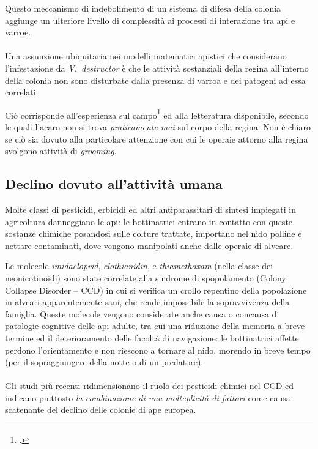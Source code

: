 Questo meccanismo di indebolimento di un sistema di difesa della colonia aggiunge un ulteriore livello di complessità ai processi di interazione tra api e varroe.

\paragraph{}
Una assunzione ubiquitaria nei modelli matematici apistici che considerano l'infestazione da \emph{V.~destructor} è
che le attività sostanziali della regina all'interno della colonia non sono disturbate dalla presenza di varroa e dei patogeni ad essa correlati.

Ciò corrisponde all'esperienza sul campo\footcite{privFDL,privFPan} ed alla letteratura disponibile, secondo le quali l'acaro non si trova \emph{praticamente mai} sul corpo della regina. Non è chiaro  se ciò sia dovuto alla particolare attenzione con cui le operaie attorno alla regina svolgono attività di \emph{grooming}.

\subsection{Declino dovuto all'attività umana}
Molte classi di pesticidi, erbicidi ed altri antiparassitari di sintesi impiegati in agricoltura danneggiano le api: le bottinatrici entrano in contatto con queste sostanze chimiche posandosi sulle colture trattate, importano nel nido polline e nettare contaminati, dove vengono manipolati anche dalle operaie di alveare.

Le molecole \emph{imidacloprid}, \emph{clothianidin}, e \emph{thiamethoxam} (nella classe dei neonicotinoidi) sono state correlate alla sindrome di spopolamento (Colony Collapse Disorder -- CCD) in cui si verifica un crollo repentino della popolazione in alveari apparentemente sani, che rende impossibile la sopravvivenza della famiglia.
Queste molecole vengono considerate anche causa o concausa di patologie cognitive delle api adulte, tra cui una riduzione della memoria a breve termine ed il deterioramento delle facoltà di navigazione: le bottinatrici affette perdono l'orientamento e non riescono a tornare al nido, morendo in breve tempo (per il sopraggiungere della notte o di un predatore).

\paragraph{}
Gli studi più recenti ridimensionano il ruolo dei pesticidi chimici nel CCD ed indicano piuttosto \emph{la combinazione di una molteplicità di fattori} come causa scatenante del declino delle colonie di ape europea.

